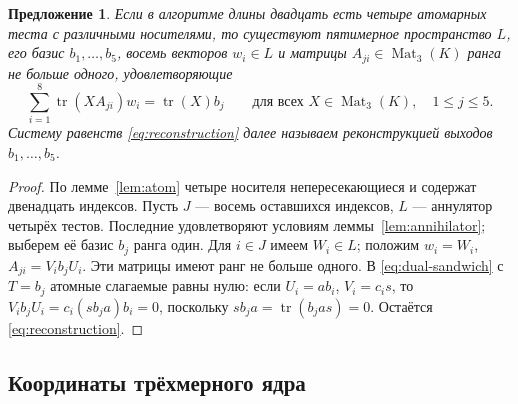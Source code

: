 \documentclass[11pt,a4paper]{article}
\numberwithin{equation}{section}
\theoremstyle{plain}
\newtheorem{prop}[theorem]{Предложение}
\theoremstyle{definition}
\DeclareMathOperator{\tr}{tr}\DeclareMathOperator{\rk}{rk}
\DeclareMathOperator{\Mat}{Mat}\DeclareMathOperator{\Span}{span}
\newcommand{\leqs}{\leqslant}\newcommand{\geqs}{\geqslant}
\begin{document}
\begin{prop}\label{prop:residual-model}
Если в алгоритме длины двадцать есть четыре атомарных теста с различными
носителями, то существуют пятимерное пространство $L$, его базис
$b_1,\ldots,b_5$, восемь векторов $w_i\in L$ и матрицы
$A_{ji}\in\Mat_3(K)$ ранга не больше одного, удовлетворяющие
\begin{equation}\label{eq:reconstruction}
 \sum_{i=1}^{8}\tr(XA_{ji})w_i=\tr(X)b_j
            \qquad\text{для всех }X\in\Mat_3(K),\quad 1\leqs j\leqs5.
\end{equation}
Систему равенств \eqref{eq:reconstruction} далее называем
\emph{реконструкцией выходов} $b_1,\ldots,b_5$.
\end{prop}
\begin{proof}
По лемме~\ref{lem:atom} четыре носителя непересекающиеся и содержат
двенадцать индексов. Пусть $J$ --- восемь оставшихся индексов,
$L$ --- аннулятор четырёх тестов. Последние удовлетворяют условиям
леммы~\ref{lem:annihilator}; выберем её базис $b_j$ ранга один.
Для $i\in J$ имеем $W_i\in L$; положим $w_i=W_i$,
$A_{ji}=V_i b_j U_i$. Эти матрицы имеют ранг не больше одного.
В \eqref{eq:dual-sandwich} с $T=b_j$ атомные слагаемые равны нулю:
если $U_i=ab_i$, $V_i=c_i s$, то
$V_i b_j U_i=c_i(s b_j a)b_i=0$, поскольку
$s b_j a=\tr(b_j as)=0$. Остаётся \eqref{eq:reconstruction}.
\end{proof}

\subsection{Координаты трёхмерного ядра}
\end{document}
